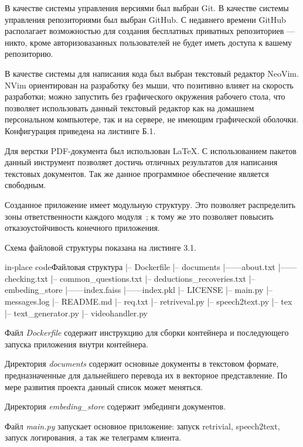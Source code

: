 В качестве системы управления версиями был выбран Git. В качестве системы 
управления репозиториями был выбран GitHub. С недавнего времени GitHub 
располагает возможностью для создания бесплатных приватных репозиториев ---
никто, кроме авторизовазанных пользователей не будет иметь доступа к вашему
репозиторию.

В качестве системы для написания кода был выбран текстовый редактор NeoVim.
NVim ориентирован на разработку без мыши, что позитивно влияет на скорость 
разработки; можно запустить без графического окружения рабочего стола, что
позволяет использовать данный текстовый редактор как на домашнем персональном
компьютере, так и на сервере, не имеющим графической оболочки. Конфигурация
приведена на листинге Б.1.

Для верстки PDF-документа был использован \LaTeX. С использованием пакетов
данный инструмент позволяет достичь отличных результатов для написания
текстовых документов. Так же данное программное обеспечение является свободным.

Созданное приложение имеет модульную структуру. Это позволяет распределить
зоны ответственности каждого модуля~\cite{solid}; к тому же это позволяет повысить 
отказоустойчивость конечного приложения. 

Схема файловой структуры показана на листинге 3.1.

\begin{codepiece}{in-place code}{Файловая структура}
|-- Dockerfile
|-- documents
|------about.txt
|------checking.txt
|--  common_questions.txt
|--  deductions_recoveries.txt
|-- embeding_store
|------index.faiss
|------index.pkl
|-- LICENSE
|-- main.py
|-- messages.log
|-- README.md
|-- req.txt
|-- retriveval.py
|-- speech2text.py
|-- tex
|-- text_generator.py
|-- videohandler.py
\end{codepiece}

Файл \emph{Dockerfile} содержит инструкцию для сборки контейнера и последующего
запуска приложения внутри контейнера.

Директория \emph{documents} содержит основные документы в текстовом формате,
предназначенные для дальнейшего перевода их в векторное представление. По мере
развития проекта данный список может меняться.

Директория \emph{embeding\_store} содержит эмбединги документов.

Файл \emph{main.py} запускает основное приложение: запуск retrivial, speech2text,
запуск логирования, а так же телеграмм клиента.


